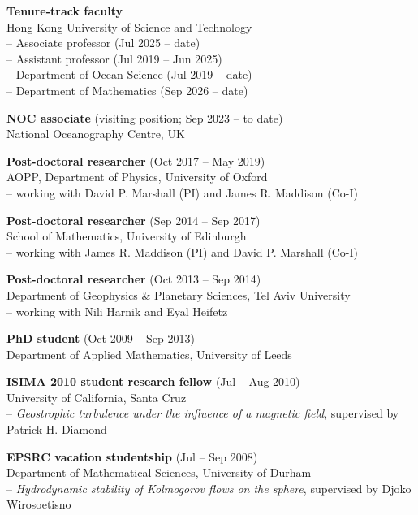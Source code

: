 \documentclass[letterpaper]{article}
\renewenvironment{itemize}{
  \begin{list}{}{
    \setlength{\leftmargin}{1.5em}
  }
}{
  \end{list}
}
\begin{document}
\begin{itemize}

\item \textbf{Tenure-track faculty}\\
Hong Kong University of Science and Technology\\
-- Associate professor (Jul 2025 -- date)\\
-- Assistant professor (Jul 2019 -- Jun 2025)\\
-- Department of Ocean Science (Jul 2019 -- date)\\
-- Department of Mathematics (Sep 2026 -- date)

\item \textbf{NOC associate} (visiting position; Sep 2023 -- to date)\\
National Oceanography Centre, UK

\item \textbf{Post-doctoral researcher} (Oct 2017 -- May 2019)\\
AOPP, Department of Physics, University of Oxford\\
-- working with David P. Marshall (PI) and James R. Maddison (Co-I) 

\item \textbf{Post-doctoral researcher} (Sep 2014 -- Sep 2017)\\
School of Mathematics, University of Edinburgh\\
-- working with James R. Maddison (PI) and David P. Marshall (Co-I)

\item \textbf{Post-doctoral researcher} (Oct 2013 -- Sep 2014)\\
Department of Geophysics \& Planetary Sciences, Tel Aviv University\\
-- working with Nili Harnik and Eyal Heifetz

\item \textbf{PhD student}  (Oct 2009 -- Sep 2013)\\
Department of Applied Mathematics, University of Leeds
	
\item \textbf{ISIMA 2010 student research fellow} (Jul -- Aug 2010)\\
University of California, Santa Cruz\\
-- \textit{Geostrophic turbulence under the influence of a magnetic field},
supervised by Patrick H. Diamond
	
\item \textbf{EPSRC vacation studentship} (Jul -- Sep 2008)\\
Department of Mathematical Sciences, University of Durham\\
-- \textit{Hydrodynamic stability of Kolmogorov flows on the sphere},
supervised by Djoko Wirosoetisno
	
\end{itemize}
\end{document}
